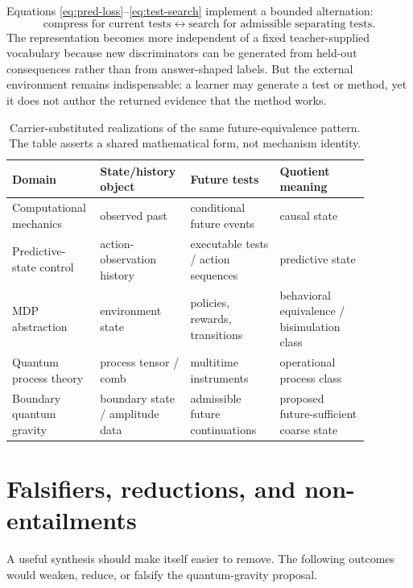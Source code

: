 \documentclass[11pt]{article}
\begin{document}
Equations \eqref{eq:pred-loss}--\eqref{eq:test-search} implement a bounded alternation:
\begin{equation}
  \text{compress for current tests}
  \longleftrightarrow
  \text{search for admissible separating tests}.
  \label{eq:alternation}
\end{equation}
The representation becomes more independent of a fixed teacher-supplied vocabulary because new discriminators can be generated from held-out consequences rather than from answer-shaped labels. But the external environment remains indispensable: a learner may generate a test or method, yet it does not author the returned evidence that the method works.

\begin{table}[t]
\caption{Carrier-substituted realizations of the same future-equivalence pattern. The table asserts a shared mathematical form, not mechanism identity.}
\label{tab:cross-domain}
\centering
\small
\begin{tabular}{@{}p{0.18\linewidth}p{0.22\linewidth}p{0.24\linewidth}p{0.24\linewidth}@{}}
\toprule
Domain & State/history object & Future tests & Quotient meaning \\
\midrule
Computational mechanics & observed past & conditional future events & causal state \\
Predictive-state control & action-observation history & executable tests / action sequences & predictive state \\
MDP abstraction & environment state & policies, rewards, transitions & behavioral equivalence / bisimulation class \\
Quantum process theory & process tensor / comb & multitime instruments & operational process class \\
Boundary quantum gravity & boundary state / amplitude data & admissible future continuations & proposed future-sufficient coarse state \\
\bottomrule
\end{tabular}
\end{table}

\section{Falsifiers, reductions, and non-entailments}
\label{sec:falsifiers}

A useful synthesis should make itself easier to remove. The following outcomes would weaken, reduce, or falsify the quantum-gravity proposal.
\end{document}
